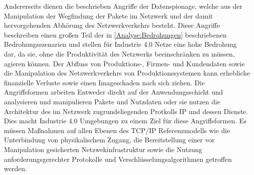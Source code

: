 Andererseits dienen die beschrieben Angriffe der Datenspionage, welche aus der Manipulation der Wegfindung der Pakete im Netzwerk und der damit hervorgehenden Abhörung des Netzwerkverkehrs besteht. Diese Angriffe beschreiben einen großen Teil der in \autoref{Analyse:Bedrohungen} beschriebenen Bedrohungsszenarien und stellen für Industrie 4.0 Netze eine hohe Bedrohung dar, da sie, ohne die Produktivität des Netzwerks beeinschränken zu müssen, agieren können. Der Abfluss von Produktions-, Firmen- und Kundendaten sowie die Manipulation des Netzwerkverkehrs von Produktionssystemen kann erhebliche finanzielle Verluste sowie einen Imageschaden nach sich ziehen. Die Angriffsformen arbeiten Entweder direkt auf der Anwendungsschicht und analysieren und manipulieren Pakete und Nutzdaten oder sie nutzen die Architektur des im Netzwerk zugrundeliegenden Protkolls \ac{IP} und dessen Dienste. Dies macht Industrie 4.0 Umgebungen zu einem Ziel für diese Angriffsformen. Es müssen Maßnahmen auf allen Ebenen des \ac{TCP}/\ac{IP} Referenzmodells wie die Unterbindung von physikalischem Zugang, die Bereitstellung einer vor Manipulation gesicherten Netzwekinfrastruktur sowie die Nutzung anforderungsgerechter Protokolle und Verschlüsselungsalgorithmen getroffen werden.
